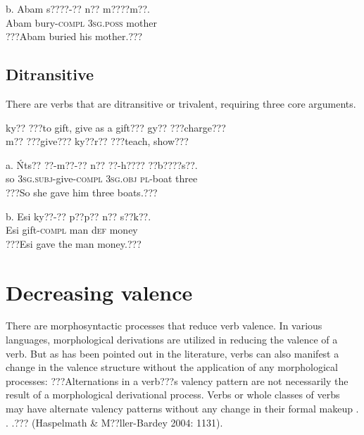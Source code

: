 \documentclass[output=paper]{langsci/langscibook}
\begin{document}
\ea
\gll  b.  Abam  s????-??     n??    m????m??.\\
       Abam  bury-\textsc{compl}  \textsc{3sg.poss}  mother\\
\glt   ???Abam buried his mother.???
\z

\subsection{Ditransitive}

There are verbs that are ditransitive or trivalent, requiring three core arguments.

\ea
ky??   \textup{???to gift, give as a gift???  }  gy??   \textup{???charge???}\\
m??     \textup{???give???}        ky??r??   \textup{???teach, show???}\\
\z

\ea
\gll a.  \'{N}ts??  ??{}-m??-??      n??    ??-h????    ??b????s??.  \\
       so  \textsc{3sg.subj}{}-give-\textsc{compl}  \textsc{3sg.obj}  \textsc{pl}{}-boat    three\\
\glt ???So she gave him three boats.??? \citep[8]{Martin1936}
\z

\ea
\gll  b.  Esi  ky??-??    p??p??  n??   s??k??.\\
       Esi  gift-\textsc{compl}  man  d\textsc{ef}  money\\
\glt   ???Esi gave the man money.???
\z

\section{Decreasing valence }

There are morphosyntactic processes that reduce verb valence. In various languages, morphological derivations are utilized in reducing the valence of a verb. But as has been pointed out in the literature, verbs can also manifest a change in the valence structure without the application of any morphological processes: ???Alternations in a verb???s valency pattern are not necessarily the result of a morphological derivational process. Verbs or whole classes of verbs may have alternate valency patterns without any change in their formal makeup . . .??? (Haspelmath \& M??ller-Bardey 2004: 1131).

\end{document}
